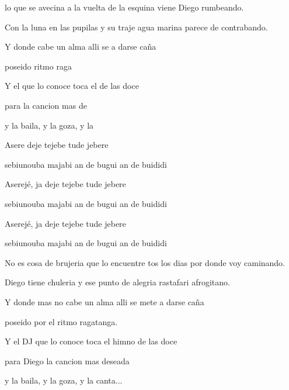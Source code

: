 

\zs
{} lo que se avecina a la vuelta de la esquina viene Diego rumbeando.

Con la luna en las pupilas y su traje agua marina parece de contrabando.


Y donde  cabe un alma alli se  a darse caña

poseido  ritmo raga

Y el  que lo conoce toca el  de las doce

para  la cancion mas de

y la baila, y la goza, y la 
\ks

\zr
Asere deje tejebe tude jebere

sebiunouba majabi an de bugui an de buididi

Aserejé, ja deje tejebe tude jebere

sebiunouba majabi an de bugui an de buididi

Aserejé, ja deje tejebe tude jebere

sebiunouba majabi an de bugui an de buididi
\kr

\zs
No es cosa de brujeria
que lo encuentre tos los dias
por donde voy caminando.

Diego tiene chuleria
y ese punto de alegria
rastafari afrogitano.

Y donde mas no cabe un alma alli se mete a darse caña

poseido por el ritmo ragatanga.

Y el DJ que lo conoce toca el himno de las doce

para Diego la cancion mas deseada

y la baila, y la goza, y la canta...
\ks

\zr
\kr

\kp



